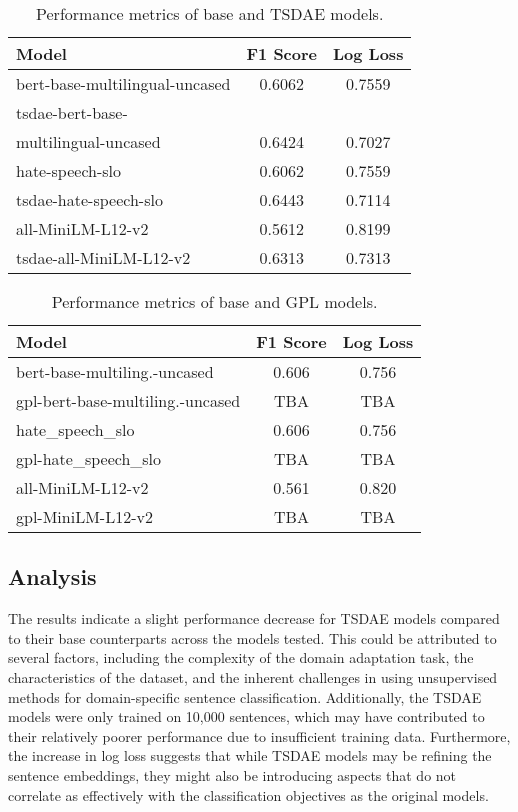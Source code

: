 \documentclass[fleqn,moreauthors,10pt]{ds_report}
\begin{document}
\begin{table}[h]
    \centering
    \begin{tabular}{l|cc}
    \hline
    \textbf{Model} & \textbf{F1 Score} & \textbf{Log Loss} \\
    \hline
    bert-base-multilingual-uncased       & 0.6062 & 0.7559 \\
    tsdae-bert-base-\\ 
    multilingual-uncased & 0.6424 & 0.7027 \\
    hate-speech-slo                      & 0.6062 & 0.7559 \\
    tsdae-hate-speech-slo                & 0.6443 & 0.7114 \\
    all-MiniLM-L12-v2                    & 0.5612 & 0.8199 \\
    tsdae-all-MiniLM-L12-v2              & 0.6313 & 0.7313 \\
    \end{tabular}
    \caption{Performance metrics of base and TSDAE models.}
    \label{table:tsdae_performance}
    \end{table}
    

\begin{table}[h]
\centering
\begin{tabular}{|l|c|c|}
\hline
\textbf{Model} & \textbf{F1 Score} & \textbf{Log Loss} \\
\hline
bert-base-multiling.-uncased & 0.606 & 0.756 \\
gpl-bert-base-multiling.-uncased & TBA & TBA \\
hate\_speech\_slo & 0.606 & 0.756 \\
gpl-hate\_speech\_slo & TBA & TBA \\
all-MiniLM-L12-v2 & 0.561 & 0.820 \\
gpl-MiniLM-L12-v2 & TBA & TBA \\
\hline
\end{tabular}
\caption{Performance metrics of base and GPL models.}
\label{table:tsdae_performance}
\end{table}

\subsection*{Analysis}

The results indicate a slight performance decrease for TSDAE models compared to their base counterparts across the models tested. This could be attributed to several factors, including the complexity of the domain adaptation task, the characteristics of the dataset, and the inherent challenges in using unsupervised methods for domain-specific sentence classification. Additionally, the TSDAE models were only trained on 10,000 sentences, which may have contributed to their relatively poorer performance due to insufficient training data. Furthermore, the increase in log loss suggests that while TSDAE models may be refining the sentence embeddings, they might also be introducing aspects that do not correlate as effectively with the classification objectives as the original models.
\end{document}
